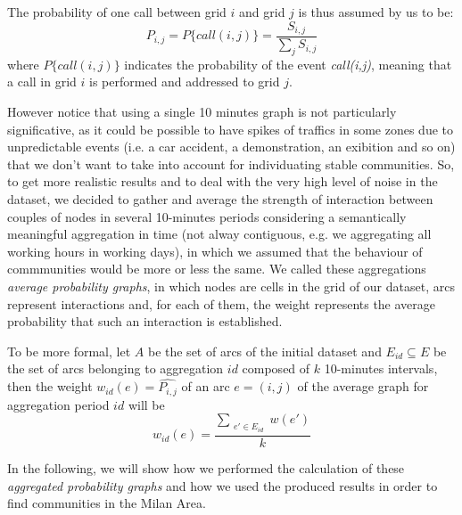 The probability of one call between grid $i$ and grid $j$ is thus assumed by us to be: 
$$
P_{i,j} = P\{call(i,j)\} = \frac{S_{i,j}}{\sum_{j}{}{S_{i,j}}}
$$
where $P\{call(i,j)\}$ indicates the probability of the event \emph{call(i,j)}, meaning that a call in grid $i$ is performed and addressed to grid $j$.

However notice that using a single 10 minutes graph is not particularly significative, as it could be possible to have spikes of traffics in some zones due to unpredictable events (i.e. a car accident, a demonstration, an exibition and so on) that we don't want to take into account for individuating stable communities.
So, to get more realistic results and to deal with the very high level of noise in the dataset,
we decided to gather and average the strength of interaction between couples of nodes in several 10-minutes periods
considering a semantically meaningful aggregation in time (not alway contiguous, e.g. we aggregating all working hours in working days), in which we assumed that the behaviour of commmunities would be more or less the same.
\label{AVGPG}
We called these aggregations \emph{average probability graphs}, in which nodes are cells in the grid of our dataset, arcs represent interactions and, for each of them, the weight represents the average probability that such an interaction is established.

To be more formal, let $A$ be the set of arcs of the initial dataset and $E_{id} \subseteq E$ be the set of arcs belonging to aggregation $id$ composed of $k$ 10-minutes intervals, then the weight $w_{id}(e)=\widehat{P_{i,j}}$ of an arc $e=(i,j)$ of the average graph for aggregation period $id$ will be 
$$
w_{id}(e) = \frac{\sum_{\substack{e' \in E_{id}}} w(e')}{k}
$$

In the following, we will show how we performed the calculation of these \emph{aggregated probability graphs} and how we used the produced results in order to find communities in the Milan Area.